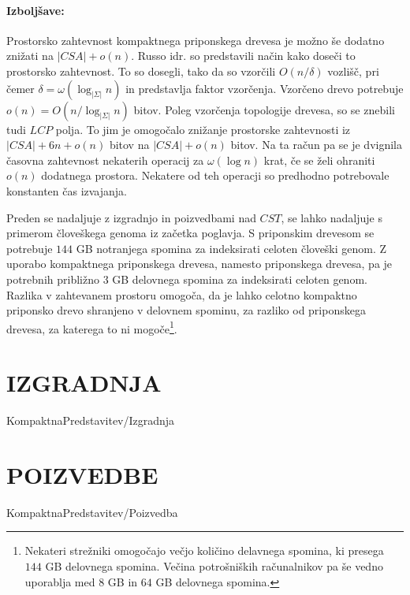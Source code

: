 \paragraph{Izboljšave:}
Prostorsko zahtevnost kompaktnega priponskega drevesa je možno še dodatno znižati na $|CSA|+o(n)$. Russo idr. \cite{Russo2008} so predstavili način kako doseči to prostorsko zahtevnost. To so dosegli, tako da so vzorčili $O(n/\delta)$ vozlišč, pri čemer $\delta=\omega(\log_{|\Sigma|}{n})$ in predstavlja faktor vzorčenja. Vzorčeno drevo potrebuje $o(n)=O(n/\log_{|\Sigma|}{n})$ bitov. Poleg vzorčenja topologije drevesa, so se znebili tudi $LCP$ polja. To jim je omogočalo znižanje prostorske zahtevnosti iz $|CSA|+6n+o(n)$ bitov na $|CSA|+o(n)$ bitov. Na ta račun pa se je dvignila časovna zahtevnost nekaterih operacij za $\omega(\log{n})$ krat, če se želi ohraniti $o(n)$ dodatnega prostora. Nekatere od teh operacji so predhodno potrebovale konstanten čas izvajanja.

Preden se nadaljuje z izgradnjo in poizvedbami nad $CST$, se lahko nadaljuje s primerom človeškega genoma iz začetka poglavja. S priponskim drevesom se potrebuje $144$ GB notranjega spomina za indeksirati celoten človeški genom. Z  uporabo kompaktnega priponskega drevesa, namesto priponskega drevesa, pa je potrebnih približno $3$ GB delovnega spomina za indeksirati celoten genom. Razlika v zahtevanem prostoru omogoča, da je lahko celotno kompaktno priponsko drevo shranjeno v delovnem spominu, za razliko od priponskega drevesa, za katerega to ni mogoče\footnote{Nekateri strežniki omogočajo večjo količino delavnega spomina, ki presega $144$ GB delovnega spomina. Večina potrošniških računalnikov pa še vedno uporablja med $8$ GB in $64$ GB delovnega spomina.}.

\section{IZGRADNJA}\label{sec:CSTizgradnja}
{KompaktnaPredstavitev/Izgradnja}

\section{POIZVEDBE}\label{sec:CSTpoizvedba}
{KompaktnaPredstavitev/Poizvedba}



